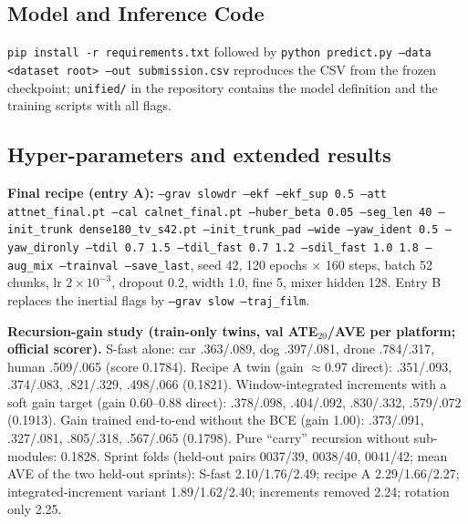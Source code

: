 \documentclass[letterpaper,10pt,conference]{ieeeconf}
\begin{document}
\subsection{Model and Inference Code}
\texttt{pip install -r requirements.txt} followed by
\texttt{python predict.py --data <dataset root> --out submission.csv}
reproduces the CSV from the frozen checkpoint; \texttt{unified/} in the repository contains the
model definition and the training scripts with all flags.

\subsection{Hyper-parameters and extended results}
\textbf{Final recipe (entry A):} \texttt{--grav slowdr --ekf --ekf\_sup 0.5 --att attnet\_final.pt
--cal calnet\_final.pt --huber\_beta 0.05 --seg\_len 40 --init\_trunk dense180\_tv\_s42.pt
--init\_trunk\_pad --wide --yaw\_ident 0.5 --yaw\_dironly --tdil 0.7 1.5 --tdil\_fast 0.7 1.2
--sdil\_fast 1.0 1.8 --aug\_mix --trainval --save\_last}, seed 42, 120 epochs $\times$ 160 steps,
batch 52 chunks, lr $2\times10^{-3}$, dropout 0.2, width 1.0, fine 5, mixer hidden 128.
Entry B replaces the inertial flags by \texttt{--grav slow --traj\_film}.

\textbf{Recursion-gain study (train-only twins, val ATE$_{20}$/AVE per platform; official scorer).}
S-fast alone: car .363/.089, dog .397/.081, drone .784/.317, human .509/.065 (score 0.1784).
Recipe A twin (gain $\approx$0.97 direct): .351/.093, .374/.083, .821/.329, .498/.066 (0.1821).
Window-integrated increments with a soft gain target (gain 0.60--0.88 direct): .378/.098, .404/.092,
.830/.332, .579/.072 (0.1913). Gain trained end-to-end without the BCE (gain 1.00): .373/.091,
.327/.081, .805/.318, .567/.065 (0.1798). Pure ``carry'' recursion without sub-modules: 0.1828.
Sprint folds (held-out pairs 0037/39, 0038/40, 0041/42; mean AVE of the two held-out sprints):
S-fast 2.10/1.76/2.49; recipe A 2.29/1.66/2.27; integrated-increment variant 1.89/1.62/2.40;
increments removed 2.24; rotation only 2.25.
\end{document}

